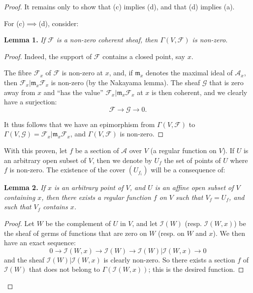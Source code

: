 \documentclass{article}
\newenvironment{itenv}[1]
  {\phantomsection\par\medskip\noindent\textbf{#1.}\itshape}
  {\medskip}
\newcommand{\scr}[1]{{\mathscr{#1}}}
\newcommand{\oldpage}[1]{\marginpar{\footnotesize$\Big\vert$ \textit{p.~#1}}}
\begin{document}
\begin{proof}
  It remains only to show that (c) implies (d), and that (d) implies (a).

  \bigskip
  For (c)$\implies$(d), consider:
  \begin{itenv}{Lemma 1}
  \label{lemma1}
    If $\scr{F}$ is a non-zero coherent sheaf, then $\Gamma(V,\scr{F})$ is non-zero.
  \end{itenv}

  \begin{proof}
    Indeed, the support of $\scr{F}$ contains a closed point, say $x$.

    The fibre $\scr{F}_x$ of $\scr{F}$ is non-zero at $x$, and, if $\mathfrak{m}_x$ denotes the maximal ideal of $\scr{A}_x$, then $\scr{F}_x|\mathfrak{m}_x\scr{F}_x$ is non-zero (by the Nakayama lemma).
    The sheaf $\scr{G}$ that is zero away from $x$ and ``has the value'' $\scr{F}_x|\mathfrak{m}_x\scr{F}_x$ at $x$ is then coherent, and we clearly have a surjection:
    \[
      \scr{F}\to\scr{G}\to0.
    \]

    It thus follows that we have an epimorphism from $\Gamma(V,\scr{F})$ to $\Gamma(V,\scr{G}) = \scr{F}_x|\mathfrak{m}_x\scr{F}_x$, and $\Gamma(V,\scr{F})$ is non-zero.
  \end{proof}

  With this proven, let $f$ be a section of $\scr{A}$ over $V$ (a regular function on $V$).
  If $U$ is an arbitrary open subset of $V$, then we denote by $U_f$ the set of points of $U$ where $f$ is non-zero.
  The existence of the cover $(U_{f_i})$ will be a consequence of:
  \begin{itenv}{Lemma 2}
  \label{lemma2}
\oldpage{2-06}
    If $x$ is an arbitrary point of $V$, and $U$ is an affine open subset of $V$ containing $x$, then there exists a regular function $f$ on $V$ such that $V_f=U_f$, and such that $V_f$ contains $x$.
  \end{itenv}

  \begin{proof}
    Let $W$ be the complement of $U$ in $V$, and let $\scr{I}(W)$ (resp. $\scr{I}(W,x)$) be the sheaf of germs of functions that are zero on $W$ (resp. on $W$ and $x$).
    We then have an exact sequence:
    \[
      0 \to \scr{I}(W,x) \to \scr{I}(W) \to \scr{I}(W)|\scr{I}(W,x) \to 0
    \]
    and the sheaf $\scr{I}(W)|\scr{I}(W,x)$ is clearly non-zero.
    So there exists a section $f$ of $\scr{I}(W)$ that does not belong to $\Gamma(\scr{I}(W,x))$;
    this is the desired function.
  \end{proof}


\end{proof}
\end{document}
